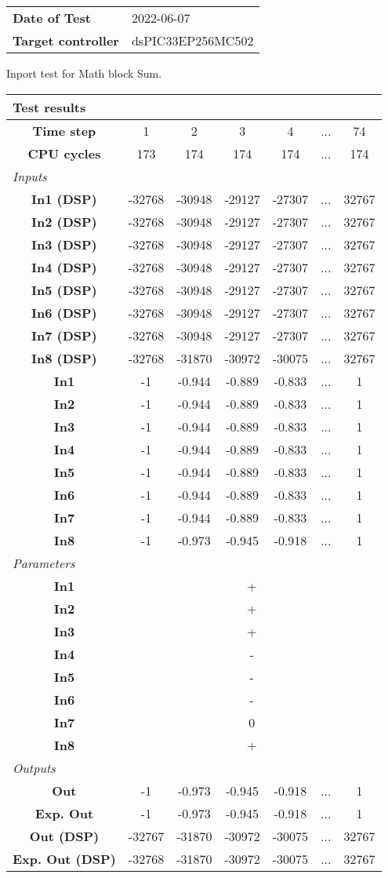 \begin{tabular}{l l}
\textbf{Date of Test} & 2022-06-07 \tabularnewline
\textbf{Target controller} & dsPIC33EP256MC502 \tabularnewline
\end{tabular}
\vspace{1ex}
Inport test for Math block Sum.

\vspace{1em}
\begin{tabularx}{\textwidth}{|c|c|c|c|c|>{\centering\arraybackslash}X|c|}
\hline
\multicolumn{7}{|l|}{\cellcolor[gray]{0.8}\textbf{Test results}} \tabularnewline \hline
\textbf{Time step} & 1 & 2 & 3 & 4 & ... & 74 \tabularnewline \hline
\textbf{CPU cycles} & 173 & 174 & 174 & 174 & ... & 174 \tabularnewline \hline
\multicolumn{7}{|l|}{\cellcolor[gray]{0.9}\textit{Inputs}} \tabularnewline \hline
\textbf{In1 (DSP)} & -32768 & -30948 & -29127 & -27307 & ... & 32767 \tabularnewline \hline
\textbf{In2 (DSP)} & -32768 & -30948 & -29127 & -27307 & ... & 32767 \tabularnewline \hline
\textbf{In3 (DSP)} & -32768 & -30948 & -29127 & -27307 & ... & 32767 \tabularnewline \hline
\textbf{In4 (DSP)} & -32768 & -30948 & -29127 & -27307 & ... & 32767 \tabularnewline \hline
\textbf{In5 (DSP)} & -32768 & -30948 & -29127 & -27307 & ... & 32767 \tabularnewline \hline
\textbf{In6 (DSP)} & -32768 & -30948 & -29127 & -27307 & ... & 32767 \tabularnewline \hline
\textbf{In7 (DSP)} & -32768 & -30948 & -29127 & -27307 & ... & 32767 \tabularnewline \hline
\textbf{In8 (DSP)} & -32768 & -31870 & -30972 & -30075 & ... & 32767 \tabularnewline \hline
\textbf{In1} & -1 & -0.944 & -0.889 & -0.833 & ... & 1 \tabularnewline \hline
\textbf{In2} & -1 & -0.944 & -0.889 & -0.833 & ... & 1 \tabularnewline \hline
\textbf{In3} & -1 & -0.944 & -0.889 & -0.833 & ... & 1 \tabularnewline \hline
\textbf{In4} & -1 & -0.944 & -0.889 & -0.833 & ... & 1 \tabularnewline \hline
\textbf{In5} & -1 & -0.944 & -0.889 & -0.833 & ... & 1 \tabularnewline \hline
\textbf{In6} & -1 & -0.944 & -0.889 & -0.833 & ... & 1 \tabularnewline \hline
\textbf{In7} & -1 & -0.944 & -0.889 & -0.833 & ... & 1 \tabularnewline \hline
\textbf{In8} & -1 & -0.973 & -0.945 & -0.918 & ... & 1 \tabularnewline \hline
\multicolumn{7}{|l|}{\cellcolor[gray]{0.9}\textit{Parameters}} \tabularnewline \hline
\textbf{In1} & \multicolumn{6}{c|}{+} \tabularnewline \hline
\textbf{In2} & \multicolumn{6}{c|}{+} \tabularnewline \hline
\textbf{In3} & \multicolumn{6}{c|}{+} \tabularnewline \hline
\textbf{In4} & \multicolumn{6}{c|}{-} \tabularnewline \hline
\textbf{In5} & \multicolumn{6}{c|}{-} \tabularnewline \hline
\textbf{In6} & \multicolumn{6}{c|}{-} \tabularnewline \hline
\textbf{In7} & \multicolumn{6}{c|}{0} \tabularnewline \hline
\textbf{In8} & \multicolumn{6}{c|}{+} \tabularnewline \hline
\multicolumn{7}{|l|}{\cellcolor[gray]{0.9}\textit{Outputs}} \tabularnewline \hline
\textbf{Out} & -1 & -0.973 & -0.945 & -0.918 & ... & 1 \tabularnewline \hline
\textbf{Exp. Out} & -1 & -0.973 & -0.945 & -0.918 & ... & 1 \tabularnewline \hline
\textbf{Out (DSP)} & -32767 & -31870 & -30972 & -30075 & ... & 32767 \tabularnewline \hline
\textbf{Exp. Out (DSP)} & -32768 & -31870 & -30972 & -30075 & ... & 32767 \tabularnewline \hline
\end{tabularx}
